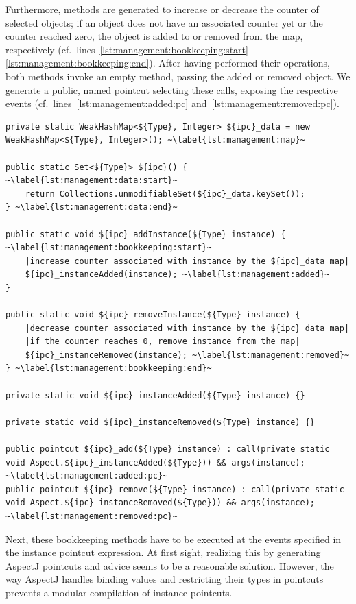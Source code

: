 \documentclass{acm_proc_article-sp}
\begin{document}
Furthermore, methods are generated to increase or decrease the counter of selected objects; if an object does not have an associated counter yet or the counter reached zero, the object is added to or removed from the map, respectively (cf.\ lines~\ref{lst:management:bookkeeping:start}--\ref{lst:management:bookkeeping:end}).
After having performed their operations, both methods invoke an empty method, passing the added or removed object.
We generate a public, named pointcut selecting these calls, exposing the respective events (cf.\ lines~\ref{lst:management:added:pc} and~\ref{lst:management:removed:pc}).

\begin{lstlisting}[float, caption={Template of generated code for instance set management.},label=lst:management]
private static WeakHashMap<${Type}, Integer> ${ipc}_data = new WeakHashMap<${Type}, Integer>(); ~\label{lst:management:map}~

public static Set<${Type}> ${ipc}() { ~\label{lst:management:data:start}~
	return Collections.unmodifiableSet(${ipc}_data.keySet());
} ~\label{lst:management:data:end}~

public static void ${ipc}_addInstance(${Type} instance) { ~\label{lst:management:bookkeeping:start}~
	|increase counter associated with instance by the ${ipc}_data map|
	${ipc}_instanceAdded(instance); ~\label{lst:management:added}~
}

public static void ${ipc}_removeInstance(${Type} instance) {
	|decrease counter associated with instance by the ${ipc}_data map|
	|if the counter reaches 0, remove instance from the map|
	${ipc}_instanceRemoved(instance); ~\label{lst:management:removed}~
} ~\label{lst:management:bookkeeping:end}~

private static void ${ipc}_instanceAdded(${Type} instance) {}

private static void ${ipc}_instanceRemoved(${Type} instance) {}

public pointcut ${ipc}_add(${Type} instance) : call(private static void Aspect.${ipc}_instanceAdded(${Type})) && args(instance); ~\label{lst:management:added:pc}~
public pointcut ${ipc}_remove(${Type} instance) : call(private static void Aspect.${ipc}_instanceRemoved(${Type})) && args(instance); ~\label{lst:management:removed:pc}~
\end{lstlisting}

Next, these bookkeeping methods have to be executed at the events specified in the instance pointcut expression.
At first sight, realizing this by generating AspectJ pointcuts and advice seems to be a reasonable solution.
However, the way AspectJ handles binding values and restricting their types in pointcuts prevents a modular compilation of instance pointcuts.
\end{document}
